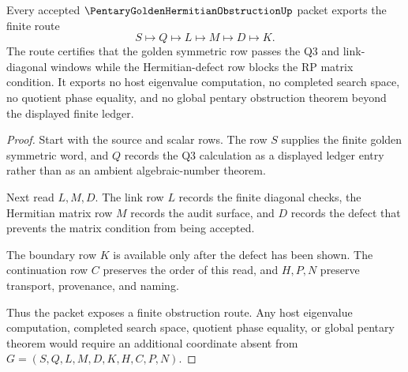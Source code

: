 \begin{theorem}
\label{thm:pentary-golden-hermitian-defect-ledger}
Every accepted $\PentaryGoldenHermitianObstructionUp$ packet exports the finite route
$$
S \longmapsto Q \longmapsto L \longmapsto M \longmapsto D \longmapsto K.
$$
The route certifies that the golden symmetric row passes the Q3 and link-diagonal windows while the Hermitian-defect row blocks the RP matrix condition. It exports no host eigenvalue computation, no completed search space, no quotient phase equality, and no global pentary obstruction theorem beyond the displayed finite ledger.
\end{theorem}
\begin{proof}
Start with the source and scalar rows. The row $S$ supplies the finite golden symmetric word, and $Q$ records the Q3 calculation as a displayed ledger entry rather than as an ambient algebraic-number theorem.

Next read $L,M,D$. The link row $L$ records the finite diagonal checks, the Hermitian matrix row $M$ records the audit surface, and $D$ records the defect that prevents the matrix condition from being accepted.

The boundary row $K$ is available only after the defect has been shown. The continuation row $C$ preserves the order of this read, and $H,P,N$ preserve transport, provenance, and naming.

Thus the packet exposes a finite obstruction route. Any host eigenvalue computation, completed search space, quotient phase equality, or global pentary theorem would require an additional coordinate absent from $G=(S,Q,L,M,D,K,H,C,P,N)$.
\end{proof}



